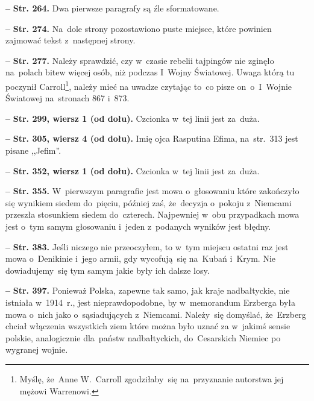 \documentclass[a4paper,11pt]{article}  %
\newcommand{\spaceFour}{0.5em}
\newcommand{\tb}{\textbf}
\newcommand{\noi}{\noindent}
\newcommand{\start}{\noi \tb{--} {}}
\newcommand{\Str}[1]{\tb{Str. #1.}}
\newcommand{\StrWd}[2]{\tb{Str. #1, wiersz #2 (od dołu).}}
\begin{document}
\start \Str{264} Dwa pierwsze paragrafy są źle sformatowane.

\vspace{\spaceFour}


\start \Str{274} Na~dole strony pozostawiono puste miejsce, które
powinien zajmować tekst z~następnej strony.

\vspace{\spaceFour}


\start \Str{277} Należy sprawdzić, czy w~czasie rebelii tajpingów nie
zginęło na~polach bitew więcej osób, niż podczas I~Wojny Światowej.
Uwaga którą tu poczynił Carroll\footnote{Myślę, że~Anne W.~Carroll
  zgodziłaby~się na~przyznanie autorstwa jej mężowi Warrenowi.},
należy mieć na uwadze czytając to~co pisze on~o~I~Wojnie Światowej
na~stronach 867 i~873.

\vspace{\spaceFour}


\start \StrWd{299}{1} Czcionka w~tej linii jest za~duża.

\vspace{\spaceFour}


\start \StrWd{305}{4} Imię ojca Rasputina Efima, na~str.~313 jest
pisane ,,Jefim''.

\vspace{\spaceFour}


\start \StrWd{352}{1} Czcionka w~tej linii jest za~duża.

\vspace{\spaceFour}


\start \Str{355} W~pierwszym paragrafie jest mowa o~głosowaniu które
zakończyło się wynikiem siedem do~pięciu, później zaś, że~decyzja
o~pokoju z~Niemcami przeszła stosunkiem siedem do~czterech. Najpewniej
w~obu przypadkach mowa jest o~tym samym głosowaniu i~jeden z~podanych
wyników jest błędny.

\vspace{\spaceFour}


\start \Str{383} Jeśli niczego nie przeoczyłem, to w~tym miejscu
ostatni raz jest mowa o~Denikinie i~jego armii, gdy wycofują~się
na~Kubań i~Krym. Nie dowiadujemy~się tym samym jakie były ich dalsze
losy.

\vspace{\spaceFour}


\start \Str{397} Ponieważ Polska, zapewne tak samo, jak kraje
nadbałtyckie, nie istniała w~1914~r., jest nieprawdopodobne, by
w~memorandum Erzberga była mowa o~nich jako o~sąsiadujących
z~Niemcami. Należy~się domyślać, że~Erzberg chciał włączenia
wszystkich ziem które można było uznać za w~jakimś sensie polskie,
analogicznie dla~państw nadbałtyckich, do~Cesarskich Niemiec po
wygranej wojnie.
\end{document}

